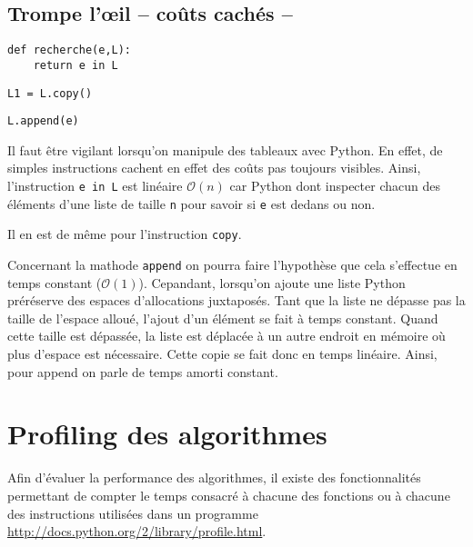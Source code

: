 \subsection{Trompe l'\oe il -- coûts cachés --}
\begin{minipage}[t]{.31\linewidth}
\begin{lstlisting}
def recherche(e,L):
    return e in L
\end{lstlisting}
\end{minipage} \hfill
\begin{minipage}[t]{.31\linewidth}
\begin{lstlisting}
L1 = L.copy()
\end{lstlisting}
\end{minipage} \hfill
\begin{minipage}[t]{.31\linewidth}
\begin{lstlisting}
L.append(e)
\end{lstlisting}
\end{minipage} 

Il faut être vigilant lorsqu'on manipule des tableaux avec Python. En effet, de simples instructions cachent en effet des coûts pas toujours visibles. 
Ainsi, l'instruction \texttt{e in L} est linéaire $\mathcal{O}(n)$ car Python dont inspecter chacun des éléments d'une liste de taille \texttt{n} pour savoir si \texttt{e} est dedans ou non.

Il en est de même pour l'instruction \texttt{copy}. 

Concernant la mathode \texttt{append} on pourra faire l'hypothèse que cela s'effectue en temps constant ($\mathcal{O}(1)$). Cepandant, lorsqu'on ajoute une liste Python préréserve des espaces d'allocations juxtaposés. Tant que la liste ne dépasse pas la taille de l'espace alloué, l'ajout d'un élément se fait à temps constant. Quand cette taille est dépassée, la liste est déplacée à un autre endroit en mémoire où plus d'espace est nécessaire. Cette copie se fait donc en temps linéaire. Ainsi, pour append on parle de temps amorti constant.

\section{Profiling des algorithmes}

Afin d'évaluer la performance des algorithmes, il existe des fonctionnalités permettant de compter le temps consacré à chacune des fonctions ou à chacune des instructions utilisées dans un programme \url{http://docs.python.org/2/library/profile.html}.

